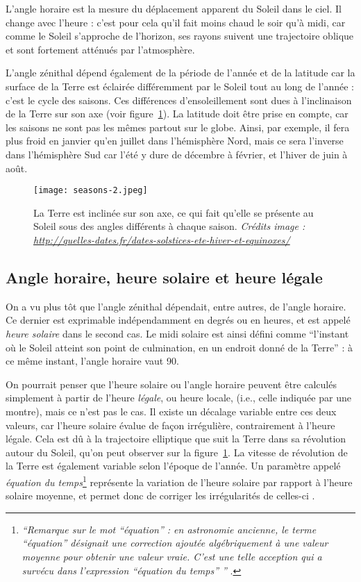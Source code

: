 \documentclass[12pt]{article}
\begin{document}
L'angle horaire est la mesure du déplacement apparent du Soleil dans le ciel. 
Il change avec l'heure : c'est pour cela qu'il fait moins chaud le soir qu'à midi, car comme le Soleil s'approche de l'horizon, ses rayons suivent une trajectoire oblique et sont fortement atténués par l'atmosphère.

L'angle zénithal dépend également de la période de l'année et de la latitude car la surface de la Terre est éclairée différemment par le Soleil tout au long de l'année : c'est le cycle des saisons.
Ces différences d'ensoleillement sont dues à l'inclinaison de la Terre sur son axe (voir figure~\ref{fig:seasons-year}).
La latitude doit être prise en compte, car les saisons ne sont pas les mêmes partout sur le globe.
Ainsi, par exemple, il fera plus froid en janvier qu'en juillet dans l'hémisphère Nord, mais ce sera l'inverse dans l'hémisphère Sud car l'été y dure de décembre à février, et l'hiver de juin à août.

 \begin{figure}[H]
	\centerline{\texttt{[image: seasons-2.jpeg]}}
	\caption{La Terre est inclinée sur son axe, ce qui fait qu'elle se présente au Soleil sous des angles différents à chaque saison. \textit{Crédits image : \url{http://quelles-dates.fr/dates-solstices-ete-hiver-et-equinoxes/}}}
	\label{fig:seasons-year}
\end{figure}
	

\subsection{Angle horaire, heure solaire et heure légale}

On a vu plus tôt que l'angle zénithal dépendait, entre autres, de l'angle horaire.
Ce dernier est exprimable indépendamment en degrés ou en heures, et est appelé \emph{heure solaire} dans le second cas.
Le midi solaire est ainsi défini comme ``l'instant où le Soleil atteint son point de culmination, en un endroit donné de la Terre''\cite{temps_solaire_wiki} : à ce même instant, l'angle horaire vaut 90\degree.

On pourrait penser que l'heure solaire ou l'angle horaire peuvent être calculés simplement à partir de l'heure \emph{légale}, ou heure locale, (i.e., celle indiquée par une montre), mais ce n'est pas le cas.
Il existe un décalage variable entre ces deux valeurs, car l'heure solaire évalue de façon irrégulière, contrairement à l'heure légale.
Cela est dû à la trajectoire elliptique que suit la Terre dans sa révolution autour du Soleil, qu'on peut observer sur la figure~\ref{fig:seasons-year}.
La vitesse de révolution de la Terre est également variable selon l'époque de l'année.
Un paramètre appelé \emph{équation du temps}\footnote{\textit{``Remarque sur le mot ``équation'' : en astronomie ancienne, le terme ``équation'' désignait une correction ajoutée algébriquement à une valeur moyenne pour obtenir une valeur vraie.
C'est une telle acception qui a survécu dans l'expression ``équation du temps'' ''} \cite{equation_temps_wiki}.} représente la variation de l'heure solaire par rapport à l'heure solaire moyenne, et permet donc de corriger les irrégularités de celles-ci \cite{equation_temps_wiki}.
\end{document}
